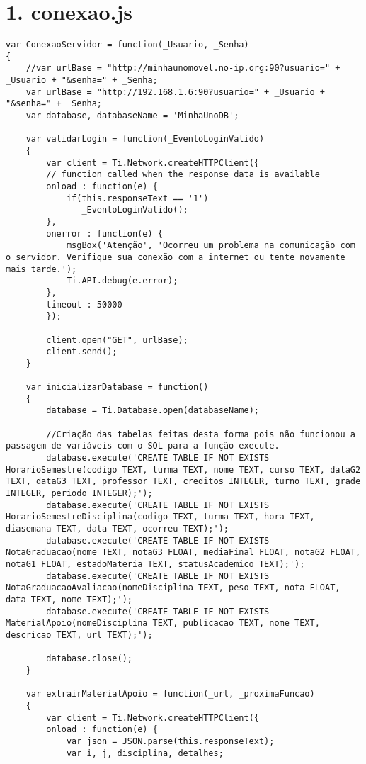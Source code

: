 \section*{1. conexao.js}
\begin{lstlisting}
var ConexaoServidor = function(_Usuario, _Senha)
{
	//var urlBase = "http://minhaunomovel.no-ip.org:90?usuario=" + _Usuario + "&senha=" + _Senha;	
	var urlBase = "http://192.168.1.6:90?usuario=" + _Usuario + "&senha=" + _Senha;	
	var database, databaseName = 'MinhaUnoDB';
		
 	var validarLogin = function(_EventoLoginValido)
 	{
 		var client = Ti.Network.createHTTPClient({
     	// function called when the response data is available
    	onload : function(e) {
     		if(this.responseText == '1')
     		   _EventoLoginValido();			         			
    	},
     	onerror : function(e) {
     		msgBox('Atenção', 'Ocorreu um problema na comunicação com o servidor. Verifique sua conexão com a internet ou tente novamente mais tarde.');
         	Ti.API.debug(e.error);
    	},
     	timeout : 50000 
 		});
 	
		client.open("GET", urlBase);
 		client.send();  
 	}
 	
 	var inicializarDatabase = function()
 	{
		database = Ti.Database.open(databaseName);
		
		//Criação das tabelas feitas desta forma pois não funcionou a passagem de variáveis com o SQL para a função execute.
		database.execute('CREATE TABLE IF NOT EXISTS HorarioSemestre(codigo TEXT, turma TEXT, nome TEXT, curso TEXT, dataG2 TEXT, dataG3 TEXT, professor TEXT, creditos INTEGER, turno TEXT, grade INTEGER, periodo INTEGER);');
		database.execute('CREATE TABLE IF NOT EXISTS HorarioSemestreDisciplina(codigo TEXT, turma TEXT, hora TEXT, diasemana TEXT, data TEXT, ocorreu TEXT);');
		database.execute('CREATE TABLE IF NOT EXISTS NotaGraduacao(nome TEXT, notaG3 FLOAT, mediaFinal FLOAT, notaG2 FLOAT, notaG1 FLOAT, estadoMateria TEXT, statusAcademico TEXT);');
		database.execute('CREATE TABLE IF NOT EXISTS NotaGraduacaoAvaliacao(nomeDisciplina TEXT, peso TEXT, nota FLOAT, data TEXT, nome TEXT);');
		database.execute('CREATE TABLE IF NOT EXISTS MaterialApoio(nomeDisciplina TEXT, publicacao TEXT, nome TEXT, descricao TEXT, url TEXT);');
		
		database.close();
 	}
 	
 	var extrairMaterialApoio = function(_url, _proximaFuncao)
 	{
 		var client = Ti.Network.createHTTPClient({
    	onload : function(e) {
     		var json = JSON.parse(this.responseText);
			var i, j, disciplina, detalhes;
			

\end{lstlisting}
